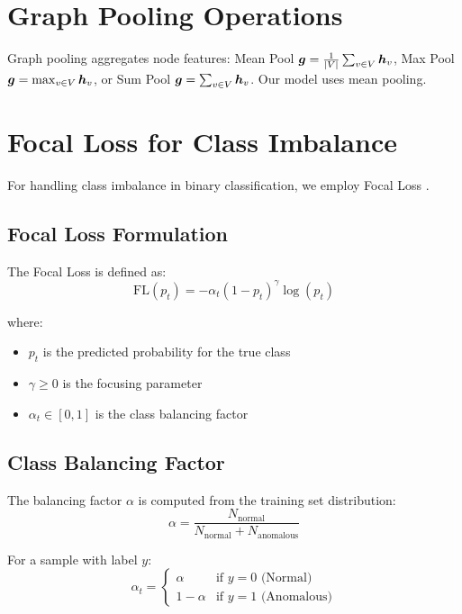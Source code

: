 \section{Graph Pooling Operations}

Graph pooling aggregates node features: Mean Pool $\bm{g} = \frac{1}{|V|} \sum_{v \in V} \bm{h}_v$, Max Pool $\bm{g} = \max_{v \in V} \bm{h}_v$, or Sum Pool $\bm{g} = \sum_{v \in V} \bm{h}_v$. Our model uses mean pooling.

\section{Focal Loss for Class Imbalance}

For handling class imbalance in binary classification, we employ Focal Loss \cite{lin2017}.

\subsection{Focal Loss Formulation}

The Focal Loss is defined as:
\begin{equation}
\boxed{
    \text{FL}(p_t) = -\alpha_t (1 - p_t)^\gamma \log(p_t)
}
\label{eq:focal_loss}
\end{equation}

where:
\begin{itemize}
    \item $p_t$ is the predicted probability for the true class
    \item $\gamma \geq 0$ is the focusing parameter
    \item $\alpha_t \in [0, 1]$ is the class balancing factor
\end{itemize}

\subsection{Class Balancing Factor}

The balancing factor $\alpha$ is computed from the training set distribution:
\begin{equation}
    \alpha = \frac{N_{\text{normal}}}{N_{\text{normal}} + N_{\text{anomalous}}}
\end{equation}

For a sample with label $y$:
\begin{equation}
    \alpha_t = \begin{cases}
        \alpha & \text{if } y = 0 \text{ (Normal)} \\
        1 - \alpha & \text{if } y = 1 \text{ (Anomalous)}
    \end{cases}
\end{equation}

